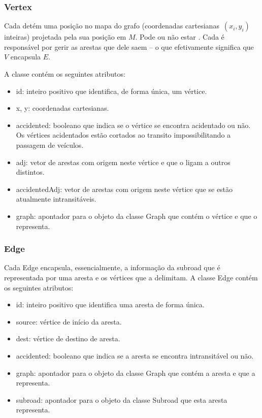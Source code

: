 \documentclass[relatorio.tex]{subfiles}
\begin{document}
\subsubsection{Vertex}
\label{subsubsec:vertex}

Cada  detém uma posição no mapa do
grafo (coordenadas cartesianas~$(x_i,y_i)$ inteiras)
projetada pela sua posição em $M$. Pode ou não estar
. Cada  é responsável por
gerir as arestas que dele saem -- o que efetivamente
significa que $V$ encapsula $E$.

A classe  contém os seguintes atributos:

\begin{itemize}
\item id: inteiro positivo que identifica, de forma única, um vértice. 
\item x, y: coordenadas cartesianas. 
\item accidented: booleano que indica se o vértice se encontra
acidentado ou não. Os vértices acidentados estão cortados ao
transito impossibilitando a passagem de veículos. 
\item adj: vetor de arestas com origem neste vértice e que o ligam a outros distintos.
\item accidentedAdj: vetor de arestas com origem neste vértice que se estão atualmente intransitáveis.
\item graph: apontador para o objeto da classe Graph que contém o vértice e que o representa.
\end{itemize}


\subsubsection{Edge}
\label{subsubsec:edge}


Cada Edge encapsula, essencialmente, a informação da subroad que
é representada por uma aresta e os vértices que a delimitam.
A classe Edge contém os seguintes atributos:

\begin{itemize}
\item id: inteiro positivo que identifica uma aresta de forma única.
\item source: vértice de início da aresta.
\item dest: vértice de destino de aresta.
\item accidented: booleano que indica se a aresta se encontra intransitável ou não.
\item graph: apontador para o objeto da classe Graph que contém a aresta e que a representa.
\item subroad: apontador para o objeto da classe Subroad que esta aresta representa.
\end{itemize}
\end{document}
